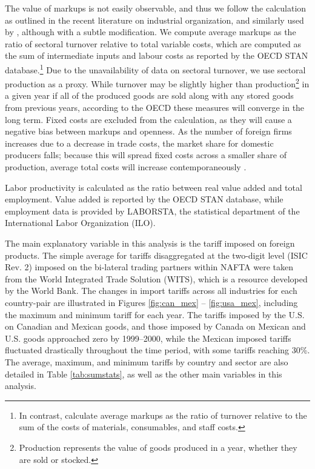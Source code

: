 The value of markups is not easily observable, and thus we follow the calculation as outlined in the recent literature on industrial organization, and similarly used by \citet{Chen2009}, although with a subtle modification. We compute average markups as the ratio of sectoral turnover relative to total variable costs, which are computed as the sum of intermediate inputs and labour costs as reported by the OECD STAN database.\footnote{In contrast, \citet{Chen2009} calculate average markups as the ratio of turnover relative to the sum of the costs of materials, consumables, and staff costs.} Due to the unavailability of data on sectoral turnover, we use sectoral production as a proxy. While turnover may be slightly higher than production\footnote{Production represents the value of goods produced in a year, whether they are sold or stocked.} in a given year if all of the produced goods are sold along with any stored goods from previous years, according to the OECD these measures will converge in the long term. Fixed costs are excluded from the calculation, as they will cause a negative bias between markups and openness. As the number of foreign firms increases due to a decrease in trade costs, the market share for domestic producers falls; because this will spread fixed costs across a smaller share of production, average total costs will increase contemporaneously \citep{Chen2009}. 

Labor productivity is calculated as the ratio between real value added and total employment. Value added is reported by the OECD STAN database, while employment data is provided by LABORSTA, the statistical department of the International Labor Organization (ILO). 

The main explanatory variable in this analysis is the tariff imposed on foreign products. The simple average for tariffs disaggregated at the two-digit level (ISIC Rev. 2) imposed on the bi-lateral trading partners within NAFTA were taken from the World Integrated Trade Solution (WITS), which is a resource developed by the World Bank. The changes in import tariffs across all industries for each country-pair are illustrated in Figures \ref{fig:can_mex} -- \ref{fig:usa_mex}, including the maximum and minimum tariff for each year. The tariffs imposed by the U.S. on Canadian and Mexican goods, and those imposed by Canada on Mexican and U.S. goods approached zero by 1999--2000, while the Mexican imposed tariffs fluctuated drastically throughout the time period, with some tariffs reaching 30\%. The average, maximum, and minimum tariffs by country and sector are also detailed in Table \ref{tab:sumstats}, as well as the other main variables in this analysis.

